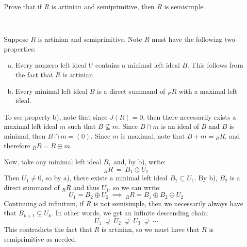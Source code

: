 \nq
\begin{exr}[title=secretly Theorem 4.14 part b)]
	Prove that if $R$ is artinian and semiprimitive, then $R$ is semisimple.
\end{exr} \

\begin{pf}
	Suppose $R$ is artinian and semiprimitive.
	Note $R$ must have the following two properties: \vspace{-0.2in}
	\begin{enumerate}[a)]
		\item Every nonzero left ideal $U$ contains a minimal left ideal $B$.
			This follows from the fact that $R$ is artinian.
		\item Every minimal left ideal $B$ is a direct summand of $_{R}R$ with
			a maximal left ideal.
	\end{enumerate}
	\begin{block}
		To see property b), note that since $J(R)=0$, then there necessarily exists
		a maximal left ideal $m$ such that $B\nsubseteq m$.
		Since $B\cap m$ is an ideal of $B$ and $B$ is minimal, then $B\cap m=(0)$.
		Since $m$ is maximal, note that $B+m={_{R}R}$, and therefore
		$_{R}R=B\oplus m$.
	\end{block}
	Now, take any minimal left ideal $B_{1}$ and, by b), write:
	\begin{equation*}
		_{R}R \ = \ B_{1}\oplus U_{1}
	\end{equation*}
	Then $U_{1}\neq0$, so by a), there exists a minimal left ideal $B_{2}\subseteq U_{1}$.
	By b), $B_{2}$ is a direct summand of $_{R}R$ and thus $U_{1}$, so we can write:
	\begin{equation*}
		U_{1} = B_{2}\oplus U_{2} \ \implies \ _{R}R = B_{1}\oplus B_{2}\oplus U_{2}
	\end{equation*}
	Continuing ad infinitum, if $R$ is not semisimple, then we necessarily always
	have that $B_{k+1}\subsetneq U_{k}$.
	In other words, we get an infinite descending chain:
	\begin{equation*}
		U_{1} \ \supsetneq \ U_{2} \ \supsetneq \ U_{3} \ \supsetneq \ \cdots
	\end{equation*}
	This contradicts the fact that $R$ is artinian, so we must have that
	$R$ is semiprimitive as needed.
\end{pf}
